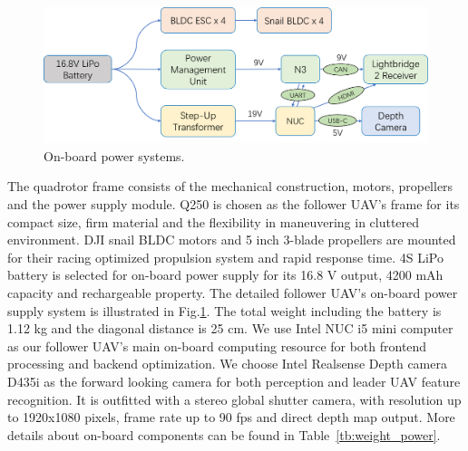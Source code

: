\begin{table}[htb]
  \centering
  \caption{Weight and power consumption of components on the follower UAV.}
  \label{tb:weight_power}
\end{table}

\begin{figure}[ht]
  \centering
  \includegraphics[width=1.0\textwidth]{figure/chapter_4/power_system.png}
  \caption{On-board power systems.}
  \label{fig:power_systems}
\end{figure}

The quadrotor frame consists of the mechanical construction, motors, propellers and the power supply module. Q250 is chosen as the follower UAV's frame for its compact size, firm material and the flexibility in maneuvering in cluttered environment. DJI snail BLDC motors and 5 inch 3-blade propellers are mounted for their racing optimized propulsion system and rapid response time. 4S LiPo battery is selected for on-board power supply for its 16.8 V output, 4200 mAh capacity and rechargeable property. The detailed follower UAV's on-board power supply system is illustrated in Fig.\ref{fig:power_systems}. The total weight including the battery is 1.12 kg and the diagonal distance is 25 cm. We use Intel NUC i5 mini computer as our follower UAV's main on-board computing resource for both frontend processing and backend optimization. We choose Intel Realsense Depth camera D435i as the forward looking camera for both perception and leader UAV feature recognition. It is outfitted with a stereo global shutter camera, with resolution up to 1920x1080 pixels, frame rate up to 90 fps and direct depth map output. More details about on-board components can be found in Table~\ref{tb:weight_power}.

